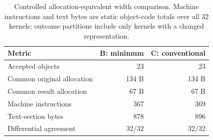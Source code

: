 \begin{table}[t]
\centering
\caption{Controlled allocation-equivalent width comparison. Machine instructions
and text bytes are static object-code totals over all 32 kernels; outcome
partitions include only kernels with a changed representation.}
\label{tab:width-choice}
\scriptsize
\begin{tabular}{@{}lrr@{}}
\toprule
Metric & B: minimum & C: conventional \\
\midrule
Accepted objects & 23 & 23 \\
Common original allocation & 134 B & 134 B \\
Common result allocation & 67 B & 67 B \\
Machine instructions & 367 & 369 \\
Text-section bytes & 878 & 896 \\
Differential agreement & 32/32 & 32/32 \\
\bottomrule
\end{tabular}
\end{table}
